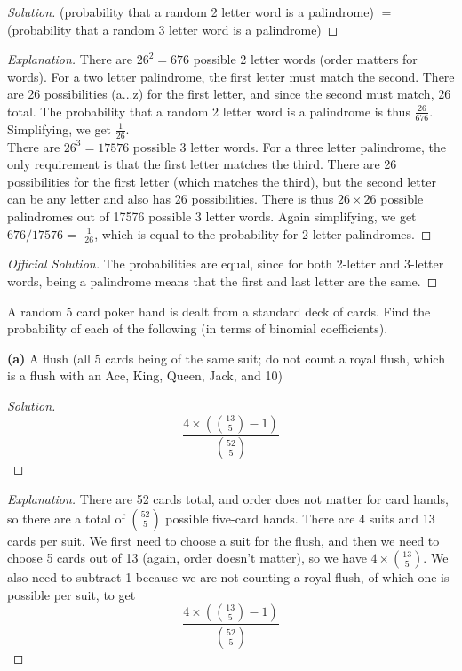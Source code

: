 \documentclass[10pt]{article}
\newenvironment{problem}[2][Problem]{\begin{trivlist}
\item[\hskip \labelsep {\bfseries #1}\hskip \labelsep {\bfseries #2.}]}{\end{trivlist}}
\begin{document}
\begin{proof}[Solution]

(probability that a random 2 letter word is a palindrome) $=$
(probability that a random 3 letter word is a palindrome)
\end{proof}

\begin{proof}[Explanation]

There are $26^2 = 676$ possible 2 letter words (order matters for words). For a two letter palindrome, the first letter must match the second. There are 26 possibilities (a...z) for the first letter, and since the second must match, 26 total. The probability that a random 2 letter word is a palindrome is thus \(\frac{26}{676}\). Simplifying, we get \(\frac{1}{26}\). \\

There are $26^3 = 17576$ possible 3 letter words. For a three letter palindrome, the only requirement is that the first letter matches the third. There are 26 possibilities for the first letter (which matches the third), but the second letter can be any letter and also has 26 possibilities. There is thus $26 \times 26$ possible palindromes out of 17576 possible 3 letter words. Again simplifying, we get $676 / 17576 = $ \(\frac{1}{26}\), which is equal to the probability for 2 letter palindromes. 

\end{proof}

\begin{proof}[Official Solution]
The probabilities are equal, since for both 2-letter and 3-letter words,
being a palindrome means that the first and last letter are the same.

\end{proof}

\begin{problem}{2} 
A random 5 card poker hand is dealt from a standard deck of cards. Find the probability of each of the following (in terms of binomial coefficients). 
\end{problem}

\textbf{(a)} A flush (all 5 cards being of the same suit; do not count a royal flush, which is a flush with an Ace, King, Queen, Jack, and 10)

\begin{proof}[Solution]
\[
    \frac{4 \times (\binom{13}{5} - 1)}{\binom{52}{5}}
\]
\end{proof}

\begin{proof}[Explanation]

There are 52 cards total, and order does not matter for card hands, so there are a total of \(\binom{52}{5}\) possible five-card hands. There are 4 suits and 13 cards per suit. We first need to choose a suit for the flush, and then we need to choose 5 cards out of 13 (again, order doesn't matter), so we have $4 \times \binom{13}{5}$. We also need to subtract 1 because we are not counting a royal flush, of which one is possible per suit, to get 
\[
    \frac{4 \times (\binom{13}{5} - 1)}{\binom{52}{5}}
\]

\end{proof}
\end{document}
